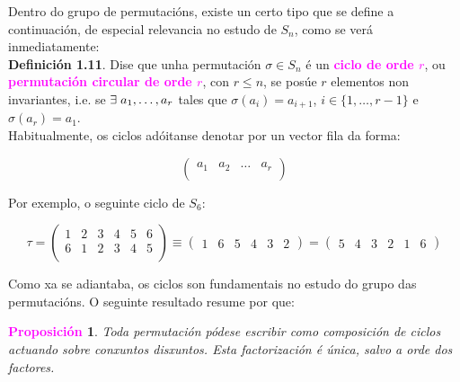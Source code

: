 \documentclass[twoside]{report}
\newcommand{\magbf}[1]{\textcolor{magenta}{\textbf{#1}}} %
\theoremstyle{mystyle}
\newtheorem{prop}{\magbf{Proposición}}[chapter]
\newenvironment{proposition}
{\begin{mdframed}[linecolor = magenta,backgroundcolor = classicrose, linewidth = 2mm]\begin{prop}}
{\end{prop}\end{mdframed}}
\begin{document}
\vspace{5mm}

\noindent Dentro do grupo de permutacións, existe un certo tipo que se define a continuación, de especial relevancia no estudo de $S_{n}$, como se verá inmediatamente: \\

\noindent \textbf{Definición 1.11}. Dise que unha permutación $\sigma \in S_{n}$ é un \textcolor{magenta}{\textbf{ciclo de orde $r$}}, ou \textcolor{magenta}{\textbf{permutación circular de orde $r$}}, con $r \leq n$, se posúe $r$ elementos non invariantes, i.e. se $ \exists \hspace{1mm} a_{1}, \dots, a_{r}$ tales que $\sigma(a_{i}) = a_{i+1}$, $i \in \{1, \dots, r-1 \}$ e $\sigma(a_{r}) = a_{1}$.\\

\noindent Habitualmente, os ciclos adóitanse denotar por un vector fila da forma: 

$$
\begin{pmatrix}
a_{1} & a_{2} & \dots & a_{r} \\
\end{pmatrix}
$$

\vspace{2mm}

\noindent Por exemplo, o seguinte ciclo de $S_{6}$:

$$ \tau = \begin{pmatrix}
1 & 2 & 3 & 4 & 5 & 6 \\
6 & 1 & 2 & 3 & 4 & 5 \\
\end{pmatrix}
\equiv 
\begin{pmatrix}
1 & 6 & 5 & 4 & 3 & 2
\end{pmatrix}
=
\begin{pmatrix}
5 & 4 & 3 & 2 & 1 & 6
\end{pmatrix}
$$

\noindent Como xa se adiantaba, os ciclos son fundamentais no estudo do grupo das permutacións. O seguinte resultado resume por que:

\vspace{5mm}

\begin{proposition} \label{prop1.5}
Toda permutación pódese escribir como composición de ciclos actuando sobre conxuntos disxuntos. Esta factorización é única, salvo a orde dos factores.
\end{proposition}

\vspace{2mm}
\end{document}
